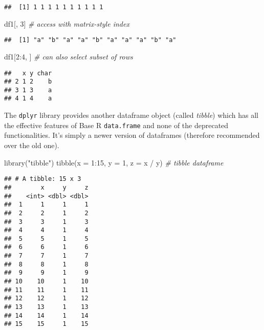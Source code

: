 \documentclass[
  oneside]{book}
\newenvironment{Shaded}{\begin{snugshade}}{\end{snugshade}}
\newcommand{\AttributeTok}[1]{\textcolor[rgb]{0.77,0.63,0.00}{#1}}
\newcommand{\CommentTok}[1]{\textcolor[rgb]{0.56,0.35,0.01}{\textit{#1}}}
\newcommand{\DecValTok}[1]{\textcolor[rgb]{0.00,0.00,0.81}{#1}}
\newcommand{\FunctionTok}[1]{\textcolor[rgb]{0.00,0.00,0.00}{#1}}
\newcommand{\NormalTok}[1]{#1}
\newcommand{\SpecialCharTok}[1]{\textcolor[rgb]{0.00,0.00,0.00}{#1}}
\newcommand{\StringTok}[1]{\textcolor[rgb]{0.31,0.60,0.02}{#1}}
\begin{document}
\begin{verbatim}
##  [1] 1 1 1 1 1 1 1 1 1 1
\end{verbatim}

\begin{Shaded}
\begin{Highlighting}[]
\NormalTok{df1[, }\DecValTok{3}\NormalTok{] }\CommentTok{\# access with matrix{-}style index}
\end{Highlighting}
\end{Shaded}

\begin{verbatim}
##  [1] "a" "b" "a" "a" "b" "a" "a" "a" "b" "a"
\end{verbatim}

\begin{Shaded}
\begin{Highlighting}[]
\NormalTok{df1[}\DecValTok{2}\SpecialCharTok{:}\DecValTok{4}\NormalTok{, ] }\CommentTok{\# can also select subset of rows}
\end{Highlighting}
\end{Shaded}

\begin{verbatim}
##   x y char
## 2 1 2    b
## 3 1 3    a
## 4 1 4    a
\end{verbatim}

The \texttt{dplyr} library provides another dataframe object (called \emph{tibble}) which has all
the effective features of Base R \texttt{data.frame} and none of the
deprecated functionalities. It's simply a newer version of dataframes (therefore
recommended over the old one).

\begin{Shaded}
\begin{Highlighting}[]
\FunctionTok{library}\NormalTok{(}\StringTok{"tibble"}\NormalTok{)}
\FunctionTok{tibble}\NormalTok{(}\AttributeTok{x =} \DecValTok{1}\SpecialCharTok{:}\DecValTok{15}\NormalTok{, }\AttributeTok{y =} \DecValTok{1}\NormalTok{, }\AttributeTok{z =}\NormalTok{ x }\SpecialCharTok{/}\NormalTok{ y) }\CommentTok{\# tibble dataframe}
\end{Highlighting}
\end{Shaded}

\begin{verbatim}
## # A tibble: 15 x 3
##        x     y     z
##    <int> <dbl> <dbl>
##  1     1     1     1
##  2     2     1     2
##  3     3     1     3
##  4     4     1     4
##  5     5     1     5
##  6     6     1     6
##  7     7     1     7
##  8     8     1     8
##  9     9     1     9
## 10    10     1    10
## 11    11     1    11
## 12    12     1    12
## 13    13     1    13
## 14    14     1    14
## 15    15     1    15
\end{verbatim}
\end{document}
